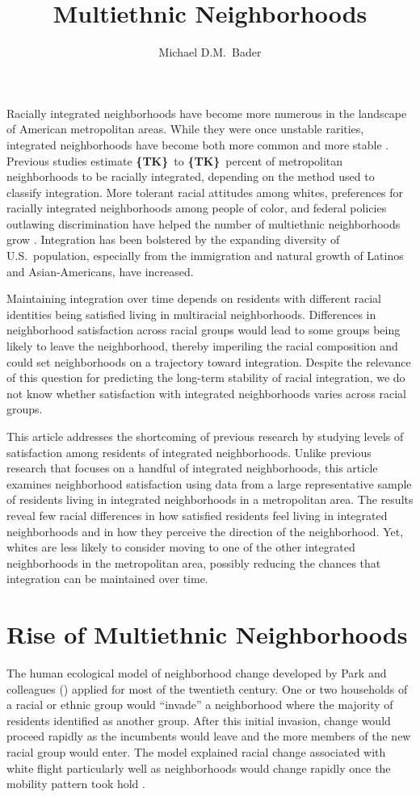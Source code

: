 \documentclass[11pt]{baderart}
\title{Multiethnic Neighborhoods}
\author{Michael D.M.~Bader}
\newcommand{\TK}{\textbf{\{TK\}}}
\begin{document}
\maketitle

\noindent Racially integrated neighborhoods have become more numerous in the landscape of American metropolitan areas. While they were once unstable rarities, integrated neighborhoods have become both more common and more stable \needcite. Previous studies estimate \TK\ to \TK\ percent of metropolitan neighborhoods to be racially integrated, depending on the method used to classify integration. More tolerant racial attitudes among whites, preferences for racially integrated neighborhoods among people of color, and federal policies outlawing discrimination have helped the number of multiethnic neighborhoods grow \needcite. Integration has been bolstered by the expanding diversity of U.S.\ population, especially from the immigration and natural growth of Latinos and Asian-Americans, have increased. 

Maintaining integration over time depends on residents with different racial identities being satisfied living in multiracial neighborhoods. Differences in neighborhood satisfaction across racial groups would lead to some groups being likely to leave the neighborhood, thereby imperiling the racial composition and could set neighborhoods on a trajectory toward integration. Despite the relevance of this question for predicting the long-term stability of racial integration, we do not know whether satisfaction with integrated neighborhoods varies across racial groups. 

This article addresses the shortcoming of previous research by studying levels of satisfaction among residents of integrated neighborhoods. Unlike previous research that focuses on a handful of integrated neighborhoods, this article examines neighborhood satisfaction using data from a large representative sample of residents living in integrated neighborhoods in a metropolitan area. The results reveal few racial differences in how satisfied residents feel living in integrated neighborhoods and in how they perceive the direction of the neighborhood. Yet, whites are less likely to consider moving to one of the other integrated neighborhoods in the metropolitan area, possibly reducing the chances that integration can be maintained over time. 

\section{Rise of Multiethnic Neighborhoods}
The human ecological model of neighborhood change developed by Park and colleagues (\needcite) applied for most of the twentieth century. One or two households of a racial or ethnic group would ``invade'' a neighborhood where the majority of residents identified as another group. After this initial invasion, change would proceed rapidly as the incumbents would leave and the more members of the new racial group would enter. The model explained racial change associated with white flight particularly well as neighborhoods would change rapidly once the mobility pattern took hold \needcite. 
\end{document}
